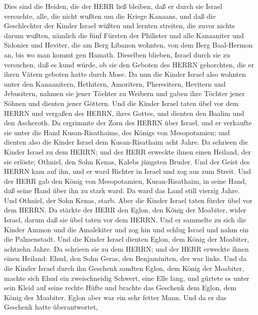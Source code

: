  Dies sind die Heiden, die der HERR ließ bleiben, daß er
durch sie Israel versuchte, alle, die nicht wußten um die Kriege
Kanaans,  und daß die Geschlechter der Kinder Israel wüßten
und lernten streiten, die zuvor nichts darum wußten, 
nämlich die fünf Fürsten der Philister und alle Kanaaniter und Sidonier
und Heviter, die am Berg Libanon wohnten, von dem Berg Baal-Hermon an,
bis wo man kommt gen Hamath.  Dieselben blieben, Israel
durch sie zu versuchen, daß es kund würde, ob sie den Geboten des HERRN
gehorchten, die er ihren Vätern geboten hatte durch Mose. 
Da nun die Kinder Israel also wohnten unter den Kanaanitern, Hethitern,
Amoritern, Pheresitern, Hevitern und Jebusitern,  nahmen sie
jener Töchter zu Weibern und gaben ihre Töchter jener Söhnen und dienten
jener Göttern.  Und die Kinder Israel taten übel vor dem
HERRN und vergaßen des HERRN, ihres Gottes, und dienten den Baalim und
den Ascheroth.  Da ergrimmte der Zorn des HERRN über Israel,
und er verkaufte sie unter die Hand Kusan-Risathaims, des Königs von
Mesopotamien; und dienten also die Kinder Israel dem Kusan-Risathaim
acht Jahre.  Da schrieen die Kinder Israel zu dem HERRN; und
der HERR erweckte ihnen einen Heiland, der sie erlöste; Othniel, den
Sohn Kenas, Kalebs jüngsten Bruder.  Und der Geist des
HERRN kam auf ihn, und er ward Richter in Israel und zog aus zum Streit.
Und der HERR gab den König von Mesopotamien, Kusan-Risathaim, in seine
Hand, daß seine Hand über ihn zu stark ward.  Da ward das
Land still vierzig Jahre. Und Othniel, der Sohn Kenas, starb.
 Aber die Kinder Israel taten fürder übel vor dem HERRN. Da
stärkte der HERR den Eglon, den König der Moabiter, wider Israel, darum
daß sie übel taten vor dem HERRN.  Und er sammelte zu sich
die Kinder Ammon und die Amalekiter und zog hin und schlug Israel und
nahm ein die Palmenstadt.  Und die Kinder Israel dienten
Eglon, dem König der Moabiter, achtzehn Jahre.  Da schrieen
sie zu dem HERRN; und der HERR erweckte ihnen einen Heiland: Ehud, den
Sohn Geras, den Benjaminiten, der war links. Und da die Kinder Israel
durch ihn Geschenk sandten Eglon, dem König der Moabiter, 
machte sich Ehud ein zweischneidig Schwert, eine Elle lang, und gürtete
es unter sein Kleid auf seine rechte Hüfte  und brachte das
Geschenk dem Eglon, dem König der Moabiter. Eglon aber war ein sehr
fetter Mann.  Und da er das Geschenk hatte überantwortet,
